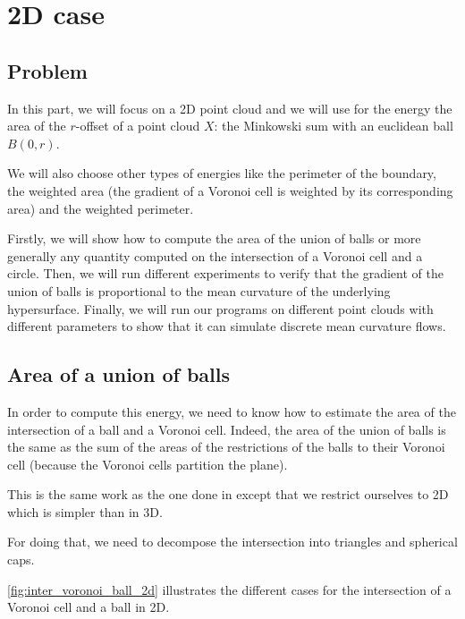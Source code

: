 \chapter{2D case}

\section{Problem}

In this part, we will focus on a 2D point cloud and we will use for the energy
the area of the $ r $-offset of a point cloud $ X $: the Minkowski sum with an
euclidean ball $ B(0, r) $.

We will also choose other types of energies like the perimeter of the boundary,
the weighted area (the gradient of a Voronoi cell is weighted by its
corresponding area) and the weighted perimeter.

Firstly, we will show how to compute the area of the union of balls or more
generally any quantity computed on the intersection of a Voronoi cell and a
circle. Then, we will run different experiments to verify that the gradient of
the union of balls is proportional to the mean curvature of the underlying
hypersurface. Finally, we will run our programs on different point clouds with
different parameters to show that it can simulate discrete mean curvature flows.

\section{Area of a union of balls}

In order to compute this energy, we need to know how to estimate the area of the
intersection of a ball and a Voronoi cell. Indeed, the area of the union of
balls is the same as the sum of the areas of the restrictions of the balls to
their Voronoi cell (because the Voronoi cells partition the plane).

This is the same work as the one done in \cite{cazals2011computing} except that
we restrict ourselves to 2D which is simpler than in 3D.

For doing that, we need to decompose the intersection into triangles and
spherical caps.

\ref{fig:inter_voronoi_ball_2d} illustrates the different cases for the
intersection of a Voronoi cell and a ball in 2D.

